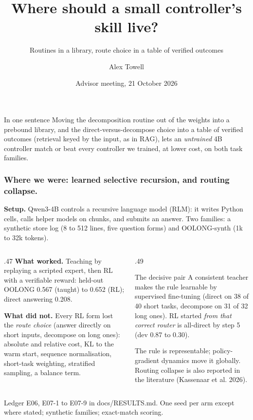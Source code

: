 \documentclass[aspectratio=169,11pt]{beamer}
\title{Where should a small controller's skill live?}
\subtitle{Routines in a library, route choice in a table of verified outcomes}
\author{Alex Towell}
\date{Advisor meeting, 21 October 2026}
\newcommand{\source}[1]{\vfill{\scriptsize\color{Gray}#1\par}}
\begin{document}
\begin{frame}[plain]
\titlepage
\vfill
\begin{block}{In one sentence}
Moving the decomposition routine out of the weights into a prebound library, and the
direct-versus-decompose choice into a table of verified outcomes (retrieval keyed by the input, as in RAG), lets an \emph{untrained} 4B
controller match or beat every controller we trained, at lower cost, on both task families.
\end{block}
\end{frame}

\begin{frame}[t]
\frametitle{Where we were: learned selective recursion, and routing collapse.}
\small
\textbf{Setup.} Qwen3-4B controls a recursive language model (RLM): it writes Python cells, calls
helper models on chunks, and submits an answer. Two families: a synthetic store log (8 to 512
lines, five question forms) and OOLONG-synth (1k to 32k tokens).
\medskip
\begin{columns}[T,onlytextwidth]
\begin{column}{.47\textwidth}
\textbf{What worked.} Teaching by replaying a scripted expert, then RL with a verifiable reward:
held-out OOLONG 0.567 (taught) to 0.652 (RL); direct answering 0.208.
\medskip

\textbf{What did not.} Every RL form lost the \emph{route choice} (answer directly on short
inputs, decompose on long ones): absolute and relative cost, KL to the warm start, sequence
normalisation, short-task weighting, stratified sampling, a balance term.
\end{column}
\begin{column}{.49\textwidth}
\begin{block}{The decisive pair}
A consistent teacher makes the rule learnable by supervised fine-tuning (direct on 38 of 40 short
tasks, decompose on 31 of 32 long ones). RL started \emph{from that correct router} is all-direct
by step 5 (dev 0.87 to 0.30).
\end{block}
The rule is representable; policy-gradient dynamics move it globally. Routing collapse is also
reported in the literature (Kassenaar et al. 2026).
\end{column}
\end{columns}
\source{Ledger E06, E07-1 to E07-9 in docs/RESULTS.md. One seed per arm except where stated; synthetic families; exact-match scoring.}
\end{frame}
\end{document}
